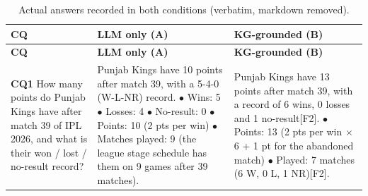 \begin{longtable}{p{1.9cm}p{6.8cm}p{6.8cm}}
\caption{Actual answers recorded in both conditions (verbatim, markdown removed).}\label{tab:cq-full}\\
\toprule \textbf{CQ} & \textbf{LLM only (A)} & \textbf{KG-grounded (B)} \\ \midrule \endfirsthead
\toprule \textbf{CQ} & \textbf{LLM only (A)} & \textbf{KG-grounded (B)} \\ \midrule \endhead
\bottomrule \endfoot
\textbf{CQ1} \newline \scriptsize How many points do Punjab Kings have after match 39 of IPL 2026, and what is their won / lost / no-result record? & \scriptsize Punjab Kings have 10 points after match 39, with a 5-4-0 (W-L-NR) record. \newline \quad$\bullet$ Wins: 5 \newline \quad$\bullet$ Losses: 4 \newline \quad$\bullet$ No-result: 0 \newline \quad$\bullet$ Points: 10 (2 pts per win) \newline \quad$\bullet$ Matches played: 9 (the league stage schedule has them on 9 games after 39 matches). & \scriptsize Punjab Kings have 13 points after match 39, with a record of 6 wins, 0 losses and 1 no-result\textsf{[F2]}. \newline \quad$\bullet$ Points: 13 (2 pts per win $\times$ 6 + 1 pt for the abandoned match) \newline \quad$\bullet$ Played: 7 matches (6 W, 0 L, 1 NR)\textsf{[F2]}. \\ \midrule

\end{longtable}
